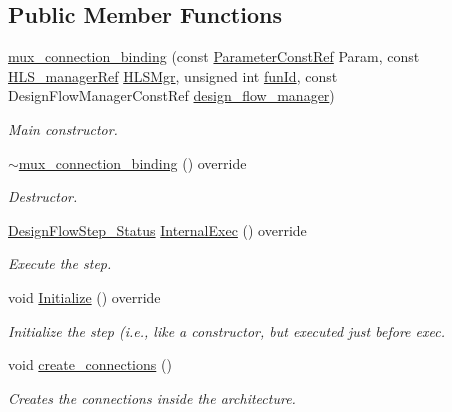 \subsection*{Public Member Functions}
\begin{DoxyCompactItemize}
\item 
\hyperlink{classmux__connection__binding_a24be4eb50d6efd12ec88d90e6efd139d}{mux\+\_\+connection\+\_\+binding} (const \hyperlink{Parameter_8hpp_a37841774a6fcb479b597fdf8955eb4ea}{Parameter\+Const\+Ref} Param, const \hyperlink{hls__manager_8hpp_acd3842b8589fe52c08fc0b2fcc813bfe}{H\+L\+S\+\_\+manager\+Ref} \hyperlink{classHLS__step_ade85003a99d34134418451ddc46a18e9}{H\+L\+S\+Mgr}, unsigned int \hyperlink{classHLSFunctionStep_a3e6434fd86c698b0c70520b859bff5b0}{fun\+Id}, const Design\+Flow\+Manager\+Const\+Ref \hyperlink{classDesignFlowStep_ab770677ddf087613add30024e16a5554}{design\+\_\+flow\+\_\+manager})
\begin{DoxyCompactList}\small\item\em Main constructor. \end{DoxyCompactList}\item 
\hyperlink{classmux__connection__binding_aa93fc534c265dc11637ef16d550e13e0}{$\sim$mux\+\_\+connection\+\_\+binding} () override
\begin{DoxyCompactList}\small\item\em Destructor. \end{DoxyCompactList}\item 
\hyperlink{design__flow__step_8hpp_afb1f0d73069c26076b8d31dbc8ebecdf}{Design\+Flow\+Step\+\_\+\+Status} \hyperlink{classmux__connection__binding_a87b0d8d8254080cb835394a5eb56eedf}{Internal\+Exec} () override
\begin{DoxyCompactList}\small\item\em Execute the step. \end{DoxyCompactList}\item 
void \hyperlink{classmux__connection__binding_af8f6b0964f86f8cf2b503a0570a425e1}{Initialize} () override
\begin{DoxyCompactList}\small\item\em Initialize the step (i.\+e., like a constructor, but executed just before exec. \end{DoxyCompactList}\item 
void \hyperlink{classmux__connection__binding_a7c22a4143586f31111cd64e34f1c9a59}{create\+\_\+connections} ()
\begin{DoxyCompactList}\small\item\em Creates the connections inside the architecture. \end{DoxyCompactList}\item 

\end{DoxyCompactItemize}
